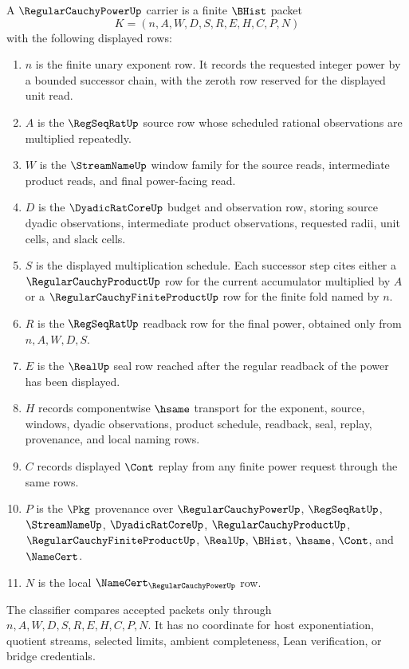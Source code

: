 \begin{definition}\label{def:regular-cauchy-power-carrier}
A $\RegularCauchyPowerUp$ carrier is a finite $\BHist$ packet
$$
K=(n,A,W,D,S,R,E,H,C,P,N)
$$
with the following displayed rows:
\begin{enumerate}
\item $n$ is the finite unary exponent row. It records the requested integer power by a bounded successor chain, with the zeroth row reserved for the displayed unit read.
\item $A$ is the $\RegSeqRatUp$ source row whose scheduled rational observations are multiplied repeatedly.
\item $W$ is the $\StreamNameUp$ window family for the source reads, intermediate product reads, and final power-facing read.
\item $D$ is the $\DyadicRatCoreUp$ budget and observation row, storing source dyadic observations, intermediate product observations, requested radii, unit cells, and slack cells.
\item $S$ is the displayed multiplication schedule. Each successor step cites either a $\RegularCauchyProductUp$ row for the current accumulator multiplied by $A$ or a $\RegularCauchyFiniteProductUp$ row for the finite fold named by $n$.
\item $R$ is the $\RegSeqRatUp$ readback row for the final power, obtained only from $n,A,W,D,S$.
\item $E$ is the $\RealUp$ seal row reached after the regular readback of the power has been displayed.
\item $H$ records componentwise $\hsame$ transport for the exponent, source, windows, dyadic observations, product schedule, readback, seal, replay, provenance, and local naming rows.
\item $C$ records displayed $\Cont$ replay from any finite power request through the same rows.
\item $P$ is the $\Pkg$ provenance over $\RegularCauchyPowerUp$, $\RegSeqRatUp$, $\StreamNameUp$, $\DyadicRatCoreUp$, $\RegularCauchyProductUp$, $\RegularCauchyFiniteProductUp$, $\RealUp$, $\BHist$, $\hsame$, $\Cont$, and $\NameCert$.
\item $N$ is the local $\NameCert_{\RegularCauchyPowerUp}$ row.
\end{enumerate}
The classifier compares accepted packets only through $n,A,W,D,S,R,E,H,C,P,N$. It has no coordinate for host exponentiation, quotient streams, selected limits, ambient completeness, Lean verification, or bridge credentials.
\end{definition}

